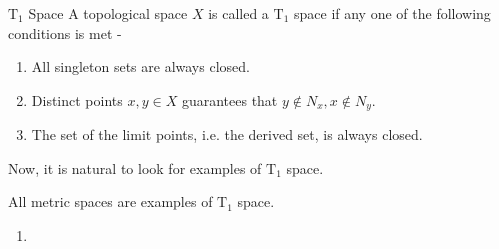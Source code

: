 \begin{Definition}{$\mathrm{T}_1$ Space}\label{T_1_space}
    A topological space $X$ is called a $\mathrm{T}_1$ space if any one of the following conditions is met -
    \begin{enumerate}
        \item All singleton sets are always closed.
        \item Distinct points $x,y\in X$ guarantees that $y\notin N_x, x\notin N_y$.
        \item The set of the limit points, i.e. the derived set, is always closed.
    \end{enumerate}
\end{Definition}
\noindent Now, it is natural to look for examples of $\mathrm{T}_1$ space.
\begin{Example}
    All metric spaces are examples of $\mathrm{T}_1$ space.
\end{Example}
\exercise
\begin{enumerate}[label=\textbf{\arabic*.}]
	\item 
\end{enumerate}
